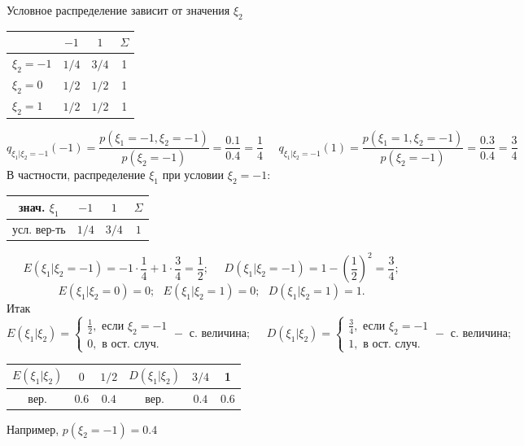 \begin{exmp}
	Условное распределение зависит от значения $\xi_2$
	\begin{table}[H]
		\centering
		\begin{tabular}{|l|c|c||c|}
			\hline
			\multicolumn{1}{|c|}{\diagbox{$\xi_2$}{$\xi_1$}} & $-1$  & $1$   & $\Sigma$ \\ \hline
			$\xi_2 = -1$                                     & $1/4$ & $3/4$ & 1        \\ \hline
			$\xi_2 = 0$                                      & $1/2$ & $1/2$ & 1        \\ \hline
			$\xi_2 = 1$                                      & $1/2$ & $1/2$ & 1        \\ \hline
		\end{tabular}
	\end{table}
	\[
	q_{\xi_1 | \xi_2 = -1} (-1) = \frac{p(\xi_1 = -1, \xi_2 = -1)}{p(\xi_2 = -1)} = \frac{0.1}{0.4} = \frac{1}{4}
	~~~~~~
	q_{\xi_1 | \xi_2 = -1} (1) = \frac{p(\xi_1 = 1, \xi_2 = -1)}{p(\xi_2 = -1)} = \frac{0.3}{0.4} = \frac{3}{4}
	\]
	В частности, распределение $\xi_1$ при условии $\xi_2 = -1$:
	\begin{table}[H]
		\centering
		\begin{tabular}{|c|c|c||c|}
			\hline
			знач. $\xi_1$ & $-1$  & $1$   & $\Sigma$ \\ \hline
			усл. вер-ть   & $1/4$ & $3/4$ & $1$      \\ \hline
		\end{tabular}
	\end{table}
\end{exmp}

\begin{exmp}
	\[
	E(\xi_1 | \xi_2 = -1) = -1 \cdot \frac{1}{4} + 1 \cdot \frac{3}{4} = \frac{1}{2}; ~~~~~~ D(\xi_1 | \xi_2 = -1) = 1 - \left( \frac{1}{2} \right)^2 = \frac{3}{4};
	\]
	\[
	E(\xi_1 | \xi_2 = 0) = 0; ~~~ E(\xi_1 | \xi_2 = 1) = 0; ~~~ D(\xi_1 | \xi_2 = 1) = 1.
	\]
	Итак
	\[
	E(\xi_1 | \xi_2) =
	\begin{cases}
		\frac{1}{2}, \text{ если } \xi_2 = -1 \\
		0, \text{ в ост. случ.}
	\end{cases}
	- \text{ с. величина};
	~~~~~~
	D(\xi_1 | \xi_2) =
	\begin{cases}
		\frac{3}{4}, \text{ если } \xi_2 = -1 \\
		1, \text{ в ост. случ.}
	\end{cases}
	- \text{ с. величина};
	\]
	\begin{table}[H]
		\centering
		\begin{tabular}{|c|c|c||c|c|c|}
			\hline
			$E(\xi_1 | \xi_2)$ & $0$   & $1/2$ & $D(\xi_1 | \xi_2)$ & $3/4$ & 1     \\ \hline
			вер.               & $0.6$ & $0.4$ & вер.               & $0.4$ & $0.6$ \\ \hline
		\end{tabular}
	\end{table}
	Например, $p(\xi_2 = -1) = 0.4$
\end{exmp}

